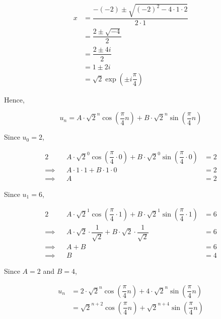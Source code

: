 \documentclass{echw}
\begin{document}
            \begin{align*}
                x &= \dfrac{-(-2) \pm \sqrt{(-2)^2 - 4\cdot1\cdot2}}{2\cdot1}\\
                &= \dfrac{2 \pm \sqrt{-4}}{2}\\
                &= \dfrac{2 \pm 4i}{2}\\
                &= 1 \pm 2i\\
                &= \sqrt{2} \exp\left({\pm i \dfrac{\pi}4}\right)
            \end{align*}

            Hence,

            \begin{equation*}
                u_n = A \cdot \sqrt{2}^n \cos \left(\dfrac{\pi}4 n \right) + B \cdot \sqrt{2}^n \sin \left(\dfrac{\pi}4 n\right)
            \end{equation*}

            Since $u_0 = 2$,
            
            \begin{alignat*}{2}
                && A \cdot \sqrt{2}^0 \cos \left(\dfrac{\pi}4 \cdot 0 \right) + B \cdot \sqrt{2}^0 \sin \left(\dfrac{\pi}4 \cdot 0\right) &= 2\\
                \implies&& A \cdot 1 \cdot 1 + B \cdot 1 \cdot 0 &= 2\\
                \implies&& A &= 2
            \end{alignat*}

            Since $u_1 = 6$,

            \begin{alignat*}{2}
                && A \cdot \sqrt{2}^1 \cos \left(\dfrac{\pi}4 \cdot 1 \right) + B \cdot \sqrt{2}^1 \sin \left(\dfrac{\pi}4 \cdot 1\right) &= 6\\
                \implies&& A \cdot \sqrt{2} \cdot \dfrac{1}{\sqrt2} + B \cdot \sqrt{2} \cdot \dfrac{1}{\sqrt2} &= 6\\
                \implies&& A + B &= 6\\
                \implies&& B &= 4
            \end{alignat*}

            Since $A = 2$ and $B = 4$,

            \begin{align*}
                u_n &= 2 \cdot \sqrt{2}^n \cos \left(\dfrac{\pi}4 n \right) + 4 \cdot \sqrt{2}^n \sin \left(\dfrac{\pi}4 n\right)\\
                &= \sqrt{2}^{n+2} \cos \left(\dfrac{\pi}4 n \right) + \sqrt{2}^{n+4} \sin \left(\dfrac{\pi}4 n\right)
            \end{align*}
\end{document}

